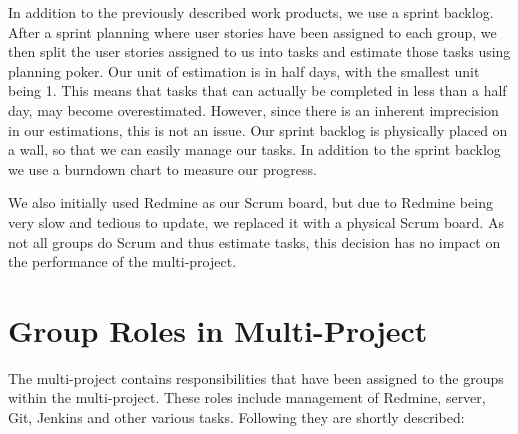In addition to the previously described work products, we use a sprint backlog. After a sprint planning where user stories have been assigned to each group, we then split the user stories assigned to us into tasks and estimate those tasks using planning poker. Our unit of estimation is in half days, with the smallest unit being 1. This means that tasks that can actually be completed in less than a half day, may become overestimated. However, since there is an inherent imprecision in our estimations, this is not an issue. Our sprint backlog is physically placed on a wall, so that we can easily manage our tasks. In addition to the sprint backlog we use a burndown chart to measure our progress.

We also initially used Redmine as our Scrum board, but due to Redmine being very slow and tedious to update, we replaced it with a physical Scrum board. As not all groups do Scrum and thus estimate tasks, this decision has no impact on the performance of the multi-project. 

\section{Group Roles in Multi-Project}\label{sec:multi_project_group_roles}
The multi-project contains responsibilities that have been assigned to the groups within the multi-project. These roles include management of Redmine, server, Git, Jenkins and other various tasks. Following they are shortly described:

